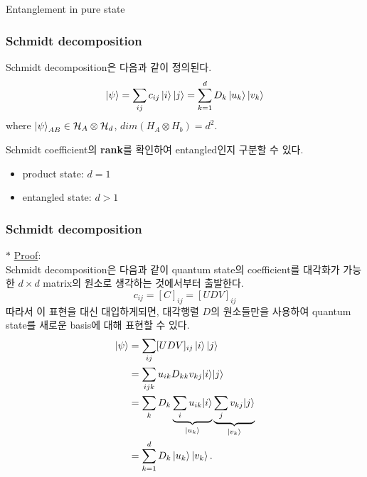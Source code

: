 \documentclass[9pt]{beamer}
\begin{document}
\begin{section}{Entanglement in pure state}
        \begin{frame}
            \frametitle{Schmidt decomposition}
            \begin{theorem}
                Schmidt decomposition은 다음과 같이 정의된다.
                \begin{equation*}
                    \ket{\psi} = \sum_{ij} c_{ij} \ket{i} \ket{j} = \sum_{k=1}^d D_{k} \ket{u_k} \ket{v_k}
                \end{equation*}
                where $\ket{\psi}_{AB} \in \mathcal H_A \otimes \mathcal H_d$, $dim(H_A \otimes H_b) = d^2$.
            \end{theorem}
            \vspace{0.4cm}
            Schmidt coefficient의 \textbf{rank}를 확인하여 entangled인지 구분할 수 있다.
            \begin{itemize}
                \item product state: $d=1$
                \item entangled state: $d>1$
            \end{itemize}
        \end{frame}

        \begin{frame}
            \frametitle{Schmidt decomposition}
            $\ast$ \underline{Proof}:\\
            \vspace{0.2cm}
            Schmidt decomposition은 다음과 같이 quantum state의 coefficient를 \alert{대각화가 가능한 $d\times d$ matrix의 원소}로 생각하는 것에서부터 출발한다.
            \begin{equation*}
                c_{ij} = [C]_{ij} = [UDV]_{ij}
            \end{equation*}
            따라서 이 표현을 대신 대입하게되면, 대각행렬 $D$의 원소들만을 사용하여 quantum state를 새로운 basis에 대해 표현할 수 있다.
            \begin{align*}
                |\psi\rangle & =\sum_{i j} [U D V]_{i j}\ket i \ket j \\
                &=\sum_{i j k} u_{i k} D_{k k} v_{k j}|i\rangle|j\rangle \\
                &=\sum_k D_k \underbrace{\sum_i u_{i k}|i\rangle}_{\left|u_k\right\rangle} \underbrace{\sum_j v_{k j}|j\rangle}_{\left|v_k\right\rangle} \\
                &=\sum_{k=1}^d D_k\left|u_k\right\rangle\left|v_k\right\rangle.
            \end{align*}
        \end{frame}


\end{section}
\end{document}
